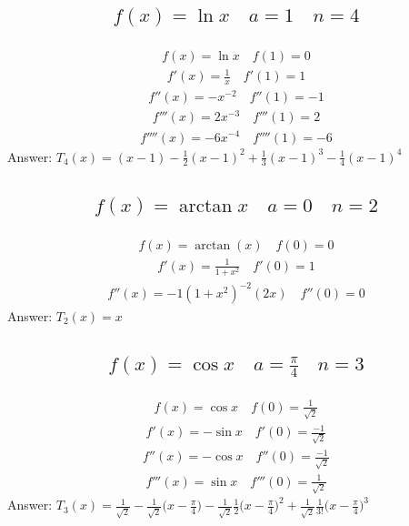 \documentclass{article}
\begin{document}
\subsection{
	\begin{align*}
		f(x) = \ln{x} \quad a = 1 \quad n = 4
	\end{align*}
}
\begin{align*}
	f(x) = \ln{x} \quad f(1) = 0
\end{align*}
\begin{align*}
	f'(x) = \frac{1}{x} \quad f'(1) = 1
\end{align*}
\begin{align*}
	f''(x) = -x^{-2} \quad f''(1) = -1
\end{align*}
\begin{align*}
	f'''(x) = 2x^{-3} \quad f'''(1) = 2
\end{align*}
\begin{align*}
	f''''(x) = -6x^{-4} \quad f''''(1) = -6
\end{align*}
Answer: $T_4 (x) = (x - 1) - \frac{1}{2} (x - 1)^2 + \frac{1}{3} (x - 1)^3 - \frac{1}{4} (x - 1)^4$

\subsection{
	\begin{align*}
		f(x) = \arctan{x} \quad a = 0 \quad n = 2
	\end{align*}
}
\begin{align*}
	f(x) = \arctan(x) \quad f(0) = 0
\end{align*}
\begin{align*}
	f'(x) = \frac{1}{1 + x^2} \quad f'(0) = 1
\end{align*}
\begin{align*}
	f''(x) = -1 (1 + x^2)^{-2} (2x) \quad f''(0) = 0
\end{align*}
Answer: $T_2 (x) = x$

\subsection{
	\begin{align*}
		f(x) = \cos{x} \quad a = \frac{\pi}{4} \quad n = 3
	\end{align*}
}
\begin{align*}
	f(x) = \cos{x} \quad f(0) = \frac{1}{\sqrt{2}}
\end{align*}
\begin{align*}
	f'(x) = -\sin{x} \quad f'(0) = \frac{-1}{\sqrt{2}}
\end{align*}
\begin{align*}
	f''(x) = -\cos{x} \quad f''(0) = \frac{-1}{\sqrt{2}}
\end{align*}
\begin{align*}
	f'''(x) = \sin{x} \quad f'''(0) = \frac{1}{\sqrt{2}}
\end{align*}
Answer: $T_3 (x) = \frac{1}{\sqrt{2}} - \frac{1}{\sqrt{2}} \bigg( x - \frac{\pi}{4} \bigg) - \frac{1}{\sqrt{2}} \frac{1}{2} \bigg( x - \frac{\pi}{4} \bigg)^2 + \frac{1}{\sqrt{2}} \frac{1}{3!} \bigg( x - \frac{\pi}{4} \bigg)^3$
\end{document}
